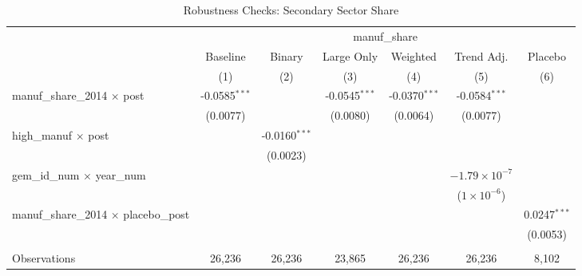 
\begin{table}[htbp]
   \caption{\label{tab:robustness} Robustness Checks: Secondary Sector Share}
   \bigskip
   \centering
   \begin{adjustbox}{max width=\textwidth}
   \begin{tabular}{lcccccc}
      \toprule
       & \multicolumn{6}{c}{manuf\_share}\\
                                                    & Baseline        & Binary          & Large Only      & Weighted        & Trend Adj.             & Placebo \\   
                                                    & (1)             & (2)             & (3)             & (4)             & (5)                    & (6)\\  
      \midrule 
      manuf\_share\_2014 $\times$ post              & -0.0585$^{***}$ &                 & -0.0545$^{***}$ & -0.0370$^{***}$ & -0.0584$^{***}$        &   \\   
                                                    & (0.0077)        &                 & (0.0080)        & (0.0064)        & (0.0077)               &   \\   
      high\_manuf $\times$ post                     &                 & -0.0160$^{***}$ &                 &                 &                        &   \\   
                                                    &                 & (0.0023)        &                 &                 &                        &   \\   
      gem\_id\_num $\times$ year\_num               &                 &                 &                 &                 & $-1.79\times 10^{-7}$  &   \\   
                                                    &                 &                 &                 &                 & ($1\times 10^{-6}$)    &   \\   
      manuf\_share\_2014 $\times$ placebo\_post     &                 &                 &                 &                 &                        & 0.0247$^{***}$\\   
                                                    &                 &                 &                 &                 &                        & (0.0053)\\   
       \\
      Observations                                  & 26,236          & 26,236          & 23,865          & 26,236          & 26,236                 & 8,102\\  

\end{tabular}
\end{adjustbox}
\end{table}
